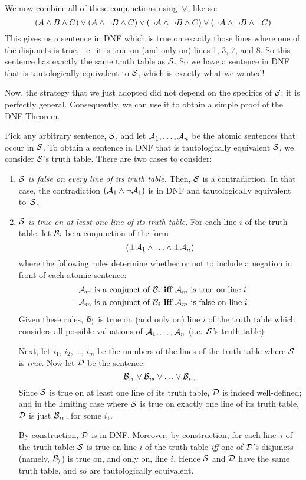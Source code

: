 We now combine all of these conjunctions using~$\vee$, like so:
$$(A \wedge B \wedge C) \vee (A \wedge \neg B \wedge C) \vee (\neg A \wedge \neg B \wedge C) \vee (\neg A \wedge \neg B \wedge \neg C)$$
This gives us a sentence in DNF which is true on exactly those lines where one of the disjuncts is true, i.e.\ it is true on (and only on) lines 1, 3, 7, and 8. So this sentence has exactly the same truth table as $\mathcal{S}$. So we have a sentence in DNF that is tautologically equivalent to $\mathcal{S}$, which is exactly what we wanted!

Now, the strategy that we just adopted did not depend on the specifics of $\mathcal{S}$; it is perfectly general. Consequently, we can use it to obtain a simple proof of the DNF Theorem.

Pick any arbitrary sentence, $\mathcal{S}$, and let $\mathcal{A}_1, \ldots, \mathcal{A}_n$ be the atomic sentences that occur in $\mathcal{S}$. To obtain a sentence in DNF that is tautologically equivalent $\mathcal{S}$, we consider $\mathcal{S}$'s truth table. There are two cases to consider:
	\begin{enumerate}
		\item \emph{$\mathcal{S}$ is false on every line of its truth table.} Then, $\mathcal{S}$ is a contradiction. In that case, the contradiction $(\mathcal{A}_1 \wedge \neg \mathcal{A}_1)$ is in DNF and tautologically equivalent to~$\mathcal{S}$. 
	
		\item \emph{$\mathcal{S}$ is true on at least one line of its truth table.}
		For each line $i$ of the truth table, let $\mathcal{B}_i$ be a conjunction of the form 
		$$(\pm\mathcal{A}_1 \land \ldots \land \pm\mathcal{A}_n)$$
		where the following rules determine whether or not to include a negation in front of each atomic sentence:
			\begin{align*}
				\mathcal{A}_m\text{ is a conjunct of }\mathcal{B}_i&\textbf{ iff }\mathcal{A}_m\text{ is true on line }i\\
				\neg\mathcal{A}_m\text{ is a conjunct of }\mathcal{B}_i&\textbf{ iff }\mathcal{A}_m\text{ is false on line }i
			\end{align*}
		Given these rules, $\mathcal{B_i}$ is true on (and only on) line $i$ of the truth table which considers all possible valuations of $\mathcal{A}_1, \ldots, \mathcal{A}_n$ (i.e.\ $\mathcal{S}$'s truth table). 
		
		Next, let $i_1$, $i_2$, \dots, $i_m$ be the numbers of the lines of the truth table where $\mathcal{S}$ is \emph{true}. Now let $\mathcal{D}$ be the sentence:
		$$\mathcal{B}_{i_1} \vee \mathcal{B}_{i_2} \vee \ldots \vee \mathcal{B}_{i_m}$$
		Since $\mathcal{S}$ is true on at least one line of its truth table, $\mathcal{D}$ is indeed well-defined; and in the limiting case where $\mathcal{S}$ is true on exactly one line of its truth table, $\mathcal{D}$ is just $\mathcal{B}_{i_1}$, for some $i_1$.
		
		By construction, $\mathcal{D}$ is in DNF. Moreover, by construction, for each line~$i$ of the truth table: $\mathcal{S}$ is true on line $i$ of the truth table \emph{iff} one of $\mathcal{D}$'s disjuncts (namely, $\mathcal{B_i}$) is true on, and only on, line $i$. Hence $\mathcal{S}$ and $\mathcal{D}$ have the same truth table, and so are tautologically equivalent.
	\end{enumerate}
